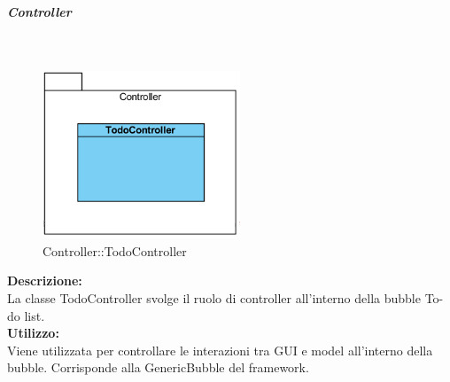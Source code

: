 \subparagraph{Controller}\mbox{}
\begin{samepage}
	\label{todo-controller}\mbox{}\\
	\nopagebreak
	\begin{figure}[H]
		\centering
		\includegraphics[height=5cm]{diagrammi_img/classi_e_package/todo_controller}
		\caption{Controller\-::Todo\-Controller}
	\end{figure}
\end{samepage}
\textbf{Descrizione:}\\
La classe TodoController svolge il ruolo di controller all'interno della bubble To-do list. \\
\textbf{Utilizzo:}\\
Viene utilizzata per controllare le interazioni tra GUI e model all'interno della bubble. Corrisponde alla GenericBubble del framework. \\